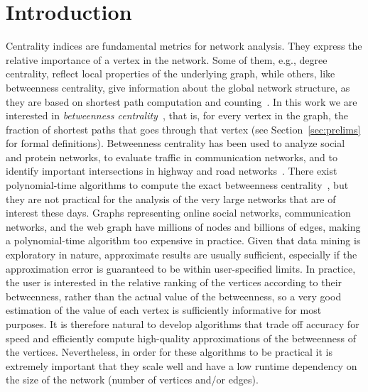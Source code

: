 \section{Introduction}\label{sec:intro}
Centrality indices are fundamental metrics for network analysis. They express the
relative importance of a vertex in the network. Some of them, e.g., degree
centrality, reflect local properties of the underlying graph, while others,
like betweenness centrality, give information about the global network
structure, as they are based on shortest path computation and counting~\citep{Newman10}. In
this work we are interested in \emph{betweenness
centrality}~\citep{Anthonisse71,Freeman77}, that is, for every vertex in the
graph, the fraction of shortest paths that goes through that vertex (see
Section~\ref{sec:prelims} for formal definitions). Betweenness centrality has
been used to analyze social and protein networks, to evaluate traffic in
communication networks, and to identify important intersections in highway and
road networks~\citep{Newman10,GeisbergerSS08}. There exist polynomial-time
algorithms to compute the exact betweenness centrality~\citep{Brandes01}, but
they are not practical for the analysis of the very large networks that are of
interest these days. Graphs representing online social networks, communication
networks, and the web graph have millions of nodes and billions of edges,
making a polynomial-time algorithm too expensive in practice. Given that data
mining is exploratory in nature, approximate results are usually sufficient,
especially if the approximation error is guaranteed to be within user-specified
limits. In practice, the user is interested in the relative ranking of the
vertices according to their betweenness, rather than the actual value of the
betweenness, so a very good estimation of the value of each vertex is
sufficiently informative for most purposes. It is therefore natural to develop
algorithms that trade off accuracy for speed and efficiently compute
high-quality approximations of the betweenness of the vertices.  Nevertheless,
in order for these algorithms to be practical it is extremely important that
they scale well and have a low runtime dependency on the size of the network
(number of vertices and/or edges).

